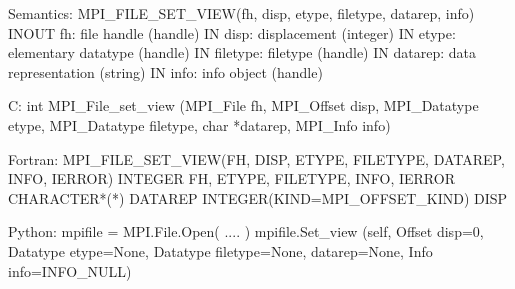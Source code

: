 Semantics:
MPI_FILE_SET_VIEW(fh, disp, etype, filetype, datarep, info)
INOUT fh: file handle (handle)
IN disp: displacement (integer)
IN etype: elementary datatype (handle)
IN filetype: filetype (handle)
IN datarep: data representation (string)
IN info: info object (handle)

C:
int MPI_File_set_view
   (MPI_File fh,
    MPI_Offset disp, MPI_Datatype etype, MPI_Datatype filetype,
    char *datarep, MPI_Info info)

Fortran:
MPI_FILE_SET_VIEW(FH, DISP, ETYPE, FILETYPE, DATAREP, INFO, IERROR)
INTEGER FH, ETYPE, FILETYPE, INFO, IERROR
CHARACTER*(*) DATAREP
INTEGER(KIND=MPI_OFFSET_KIND) DISP 

Python:
mpifile = MPI.File.Open( .... )
mpifile.Set_view
  (self,
   Offset disp=0, Datatype etype=None, Datatype filetype=None,
   datarep=None, Info info=INFO_NULL)
